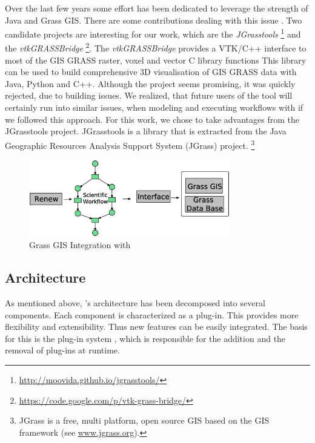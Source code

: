 Over the last few years some effort has been dedicated to leverage the strength of Java and Grass GIS. 
%
There are some contributions dealing with this issue \cite{moldt18}. 
%
Two candidate projects are interesting for our work, which are the \textit{JGrasstools}%
\footnote{\url{http://moovida.github.io/jgrasstools/}} 
and the \textit{vtkGRASSBridge}%
\footnote{\url{https://code.google.com/p/vtk-grass-bridge/}}.
%
The \textit{vtkGRASSBridge} provides a VTK/C++ interface to most of the GIS GRASS raster, voxel and vector C library functions
%
This library can be used to build comprehensive 3D visualisation of GIS GRASS data with Java, Python and C++.
%
Although the project seems promising, it was quickly rejected, due to building issues. 
%
We realized, that future users of the tool will certainly run into similar issues, when modeling and executing workflows with \RenewGrass{} if we followed this approach.
%
For this work, we chose to take advantages from the JGrasstools project.
%
JGrasstools is a library that is extracted from the Java Geographic Resources Analysis Support System (JGrass) project.%
\footnote{JGrass is a free, multi platform, open source GIS based on the GIS framework (see \url{www.jgrass.org}).}
%

\begin{figure}[!t]
\centering
\includegraphics[width=0.78\textwidth,height=0.24\textheight]{images/overview}
\caption{Grass GIS Integration with \Renew{}}
\label{fig:overview}
\end{figure}


\subsection{Architecture}
\label{sec:arch}
%
As mentioned above, \Renew{}'s architecture has been decomposed into several components.
%
Each component is characterized as a plug-in.
%
This provides more flexibility and extensibility.
%
Thus new features can be easily integrated.
%
The basis for this is the \Renew{} plug-in system \cite{Duvigneau10}, which is responsible for the addition and the removal of plug-ins at runtime.


